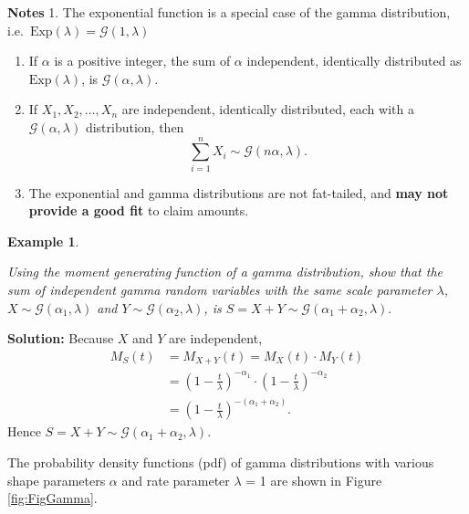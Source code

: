 \documentclass[landscape, 20pt]{extreport}
\theoremstyle{definition}
\theoremstyle{definition}
\newtheorem{example}{Example}[chapter]
\theoremstyle{definition}
\theoremstyle{definition}
\theoremstyle{remark}
\begin{document}
\textbf{Notes}
1. The exponential function is a special case of the gamma
distribution, i.e.~\(\text{Exp}(\lambda)= \mathcal{G}(1,\lambda)\)

\begin{enumerate}
\def\labelenumi{\arabic{enumi}.}
\setcounter{enumi}{1}
\item
  If \(\alpha\) is a positive integer, the sum of \(\alpha\) independent,
  identically distributed as \(\text{Exp}(\lambda)\), is
  \(\mathcal{G}(\alpha, \lambda)\).
\item
  If \(X_1, X_2, \ldots, X_n\) are independent, identically distributed,
  each with a \(\mathcal{G}(\alpha, \lambda)\) distribution, then
  \[\sum_{i = 1}^n X_i \sim \mathcal{G}(n\alpha, \lambda).\]
\item
  The exponential and gamma distributions are not fat-tailed, and
  \textbf{may not provide a good fit} to claim amounts.
\end{enumerate}

\begin{example}
\protect\hypertarget{exm:unlabeled-div-29}{}\label{exm:unlabeled-div-29}

\emph{Using the moment generating function of a gamma
distribution, show that the sum of independent gamma random variables
with the same scale parameter \(\lambda\),
\(X \sim \mathcal{G}(\alpha_1, \lambda)\) and
\(Y \sim \mathcal{G}(\alpha_2, \lambda)\), is
\(S = X+ Y \sim \mathcal{G}(\alpha_1 + \alpha_2, \lambda).\)}

\end{example}

\textbf{Solution:}
Because \(X\) and \(Y\) are independent, \[\begin{aligned}
    M_S(t) &= M_{X+Y}(t) = M_X(t) \cdot M_Y(t)\\
        &= (1 - \frac{t}{\lambda})^{-\alpha_1} \cdot (1 - \frac{t}{\lambda})^{-\alpha_2}     \\
        &=  (1 - \frac{t}{\lambda})^{-(\alpha_1 + \alpha_2)}. \end{aligned}\]
Hence \(S = X + Y \sim \mathcal{G}(\alpha_1 + \alpha_2, \lambda).\)

The probability density functions (pdf) of gamma distributions with
various shape parameters \(\alpha\) and rate parameter \(\lambda\) = 1 are shown in Figure \ref{fig:FigGamma}.
\end{document}
